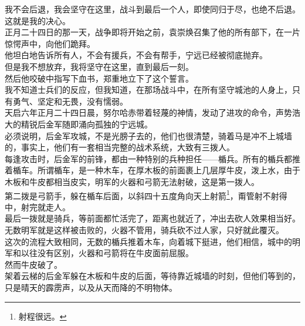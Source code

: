 \begin{multicols}{\theparacolNo}
我不会后退，我会坚守在这里，战斗到最后一个人，即使同归于尽，也绝不后退。\\

这就是我的决心。\\

正月二十四日的那一天，战争即将开始之前，袁崇焕召集了他的所有部下，在一片惊愕声中，向他们跪拜。\\

他坦白地告诉所有人，不会有援兵，不会有帮手，宁远已经被彻底抛弃。\\

但是我不想放弃，我将坚守在这里，直到最后一刻。\\

然后他咬破中指写下血书，郑重地立下了这个誓言。\\

我不知道士兵们的反应，但我知道，在那场战斗中，在所有坚守城池的人身上，只有勇气、坚定和无畏，没有懦弱。\\

天启六年正月二十四日晨，努尔哈赤带着轻蔑的神情，发动了进攻的命令，声势浩大的精锐后金军随即涌向孤独的宁远城。\\

必须说明，后金军攻城，不是光膀子去的，他们也很清楚，骑着马是冲不上城墙的，事实上，他们有一套相当完整的战术系统，大致有三拨人。\\

每逢攻击时，后金军的前锋，都由一种特别的兵种担任——楯兵。所有的楯兵都推着楯车。所谓楯车，是一种木车，在厚木板的前面裹上几层厚牛皮，泼上水，由于木板和牛皮都相当皮实，明军的火器和弓箭无法射破，这是第一拨人。\\

第二拨是弓箭手，躲在楯车后面，以斜四十五度角向天上射箭\footnote{射程很远。}，甭管射不射得中，射完就走人。\\

最后一拨就是骑兵，等前面都忙活完了，距离也就近了，冲出去砍人效果相当好。\\

无数明军就是这样被击败的，火器不管用，骑兵砍不过人家，只好就此覆灭。\\

这次的流程大致相同，无数的楯兵推着木车，向着城下挺进，他们相信，城中的明军和以往没有区别，火器和弓箭将在牛皮面前屈服。\\

然而牛皮破了。\\

架着云梯的后金军躲在木板和牛皮的后面，等待靠近城墙的时刻，但他们等到的，只是晴天的霹雳声，以及从天而降的不明物体。\\


\end{multicols}
